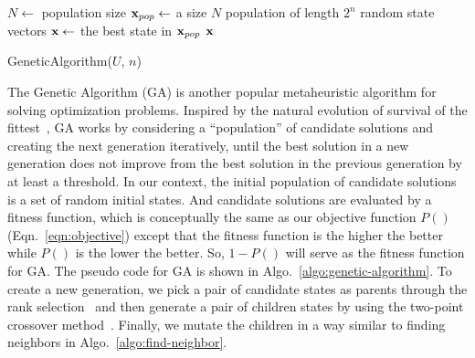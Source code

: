 \begin{algorithm}[b] 
        $N \leftarrow$ population size\;
	$\mathbf{x}_{pop} \leftarrow$ a size $N$ population of length $2^{n}$ random state vectors\;
        $\mathbf{x} \leftarrow$ the best state in $\mathbf{x}_{pop}$   \;
	\Return $\mathbf{x}$ \;
	\caption{GeneticAlgorithm($U$, $n$)}
\label{algo:genetic-algorithm}
\end{algorithm}

The Genetic Algorithm (GA) is another popular metaheuristic algorithm for solving optimization problems.
Inspired by the natural evolution of survival of the fittest~\cite{Holland_1992}, 
GA works by considering a ``population'' of candidate solutions and creating the
next generation iteratively, until the best solution in a new generation does not
improve from the best solution in the previous generation by at least a threshold.
In our context, the initial population of candidate solutions is a set of random initial states. 
And candidate solutions are evaluated by a fitness function, which is conceptually the same as our objective function $P()$ (Eqn.~\ref{eqn:objective}) except that the fitness function is the higher the better while $P()$ is the lower the better.
So, $1-P()$ will serve as the fitness function for GA.
The pseudo code for GA is shown in Algo.~\ref{algo:genetic-algorithm}.
To create a new generation, we pick a pair of candidate states as parents through the rank selection~\cite{review-ga} and then generate a pair of children states by using the two-point crossover method~\cite{review-ga}. 
Finally, we mutate the children in a way similar to finding neighbors in Algo.~\ref{algo:find-neighbor}.

